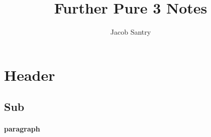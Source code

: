 \documentclass[a4paper]{article}
\title{Further Pure 3 Notes}
\author{Jacob Santry}
\begin{document}
\maketitle
\tableofcontents

\section{Header}
\subsection{Sub}
\normalsize
\paragraph{paragraph}\mbox{}\\
\end{document}
